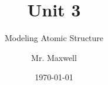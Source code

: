 \documentclass{beamer}
\title{Unit 3}
\subtitle{Modeling Atomic Structure}
\author{Mr. Maxwell}
\institute{PACS}
\date{\today}
\begin{document}
\frame{\titlepage}
\end{document}
